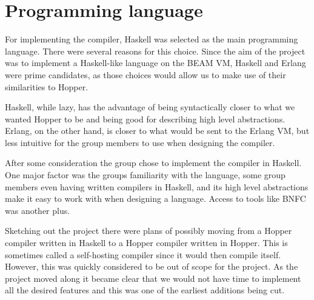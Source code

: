 \section{Programming language}




For implementing the compiler, Haskell was selected as the main programming language. There were several reasons for this choice. Since the aim of the project was to implement a Haskell-like language on the BEAM VM, Haskell and Erlang were prime candidates, as those choices would allow us to make use of their similarities to Hopper. 

Haskell, while lazy, has the advantage of being syntactically closer to what we wanted Hopper to be and being good for describing high level abstractions. Erlang, on the other hand, is closer to what would be sent to the Erlang VM, but less intuitive for the group members to use when designing the compiler.


After some consideration the group chose to implement the compiler in Haskell. One major factor was the groups familiarity with the language, some group members even having written compilers in Haskell, and its high level abstractions make it easy to work with when designing a language. Access to tools like BNFC was another plus.

Sketching out the project there were plans of possibly moving from a Hopper compiler written in Haskell to a Hopper compiler written in Hopper. This is sometimes called a self-hosting compiler since it would then compile itself. However, this was quickly considered to be out of scope for the project.  As the project moved along it became clear that we would not have time to implement all the desired features and this was one of the earliest additions being cut.

